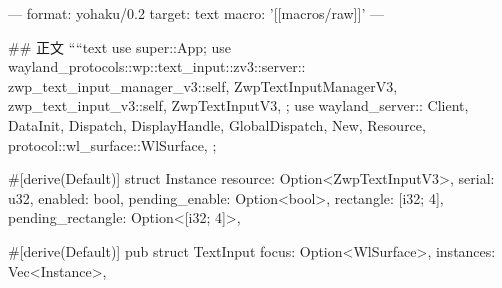 ---
format: yohaku/0.2
target: text
macro: '[[macros/raw]]'
---

## 正文
````text
use super::App;
use wayland_protocols::wp::text_input::zv3::server::{
    zwp_text_input_manager_v3::{self, ZwpTextInputManagerV3},
    zwp_text_input_v3::{self, ZwpTextInputV3},
};
use wayland_server::{
    Client, DataInit, Dispatch, DisplayHandle, GlobalDispatch, New, Resource,
    protocol::wl_surface::WlSurface,
};

#[derive(Default)]
struct Instance {
    resource: Option<ZwpTextInputV3>,
    serial: u32,
    enabled: bool,
    pending_enable: Option<bool>,
    rectangle: [i32; 4],
    pending_rectangle: Option<[i32; 4]>,
}

#[derive(Default)]
pub struct TextInput {
    focus: Option<WlSurface>,
    instances: Vec<Instance>,
}

